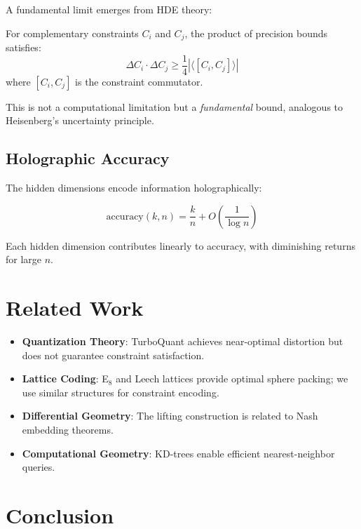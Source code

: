 \documentclass{article}
\begin{document}
A fundamental limit emerges from HDE theory:

\begin{theorem}
For complementary constraints $C_i$ and $C_j$, the product of precision bounds satisfies:
\begin{equation}
\Delta C_i \cdot \Delta C_j \geq \frac{1}{4}|\langle[C_i, C_j]\rangle|
\end{equation}
where $[C_i, C_j]$ is the constraint commutator.
\end{theorem}

This is not a computational limitation but a \textit{fundamental} bound, analogous to Heisenberg's uncertainty principle.

\subsection{Holographic Accuracy}

The hidden dimensions encode information holographically:

\begin{equation}
\text{accuracy}(k, n) = \frac{k}{n} + O\left(\frac{1}{\log n}\right)
\end{equation}

Each hidden dimension contributes linearly to accuracy, with diminishing returns for large $n$.

\section{Related Work}

\begin{itemize}
    \item \textbf{Quantization Theory}: TurboQuant achieves near-optimal distortion but does not guarantee constraint satisfaction.
    \item \textbf{Lattice Coding}: E$_8$ and Leech lattices provide optimal sphere packing; we use similar structures for constraint encoding.
    \item \textbf{Differential Geometry}: The lifting construction is related to Nash embedding theorems.
    \item \textbf{Computational Geometry}: KD-trees enable efficient nearest-neighbor queries.
\end{itemize}

\section{Conclusion}
\end{document}
